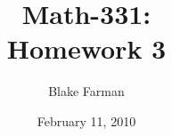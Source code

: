 \documentclass[10pt]{amsart}
\author{Blake Farman}
\title{Math-331:\\Homework 3}
\date{February 11, 2010}\pdfpagewidth 8.5in
\begin{document}
\maketitle

\newcommand{\Z}{\mathbb{Z}}
\newcommand{\R}{\mathbb{R}}
\newcommand{\Q}{\mathbb{Q}}
\newcommand{\C}{\mathbb{C}}

\renewcommand{\qedsymbol}{\(\blacksquare\)}
\newcommand{\znz}[1]{\Z / #1\Z}
\newcommand{\mznz}[1]{(\Z / #1\Z)^*}

\renewcommand{\phi}{\varphi}
\newenvironment{alphaenum}{
  \begin{enumerate}
    \renewcommand{\theenumi}{(\alph{enumi})}
    \renewcommand{\labelenumi}{\theenumi}
  }
  {\end{enumerate}}

\newenvironment{as}{\begin{align*}}{\end{align*}}

\newcommand{\quadeq}[3]{\frac{-(#2) \pm \sqrt{(#2)^2 - 4(#1)(#3)}}{2(#3)}}

\newtheorem{thm}{}
\end{document}
